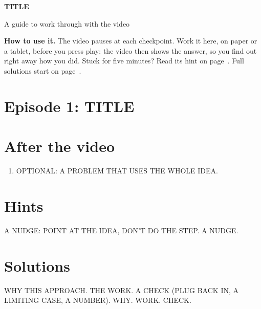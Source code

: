 \documentclass[11pt]{article}
\begin{document}
{\LARGE\bfseries TITLE}\par
{\color{mtkmuted} A guide to work through with the video}\par\medskip

\textbf{How to use it.} The video pauses at each checkpoint. Work it here, on paper or a tablet, before you
press play: the video then shows the answer, so you find out right away how you did. Stuck for five minutes? Read
its hint on page~\pageref{hints}. Full solutions start on page~\pageref{solutions}.

\section*{Episode 1: TITLE}



\section*{After the video}
\begin{enumerate}
  \item OPTIONAL: A PROBLEM THAT USES THE WHOLE IDEA.
\end{enumerate}

\clearpage
\section*{Hints}\label{hints}
 A NUDGE: POINT AT THE IDEA, DON'T DO THE STEP.
 A NUDGE.

\clearpage
\section*{Solutions}\label{solutions}
WHY THIS APPROACH. THE WORK. A CHECK (PLUG BACK IN, A LIMITING CASE, A NUMBER).
WHY. WORK. CHECK.
\end{document}
